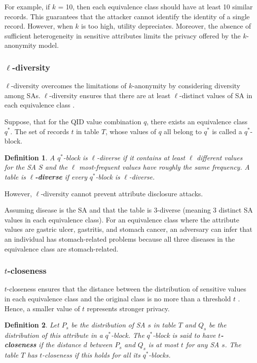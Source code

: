 \documentclass{bioinfo}
\newtheorem{definition}{Definition}
\newcommand{\mpara}[1]{\medskip\noindent{\bf #1}}
\begin{document}
For example, if $k$ = 10, then each equivalence class should have at least 10 similar records. This guarantees that the attacker cannot identify the identity of a single record. However, when $k$ is too high, utility depreciates. Moreover, the absence of sufficient heterogeneity in sensitive attributes limits the privacy offered by the $k$-anonymity model.


\subsubsection{$\ell$-diversity} 
$\ell$-diversity overcomes the limitations of $k$-anonymity by considering diversity among SAs. $\ell$-diversity ensures that there are at least $\ell$-distinct values of SA in each equivalence class \cite{cite3machanavajjhala2007diversity}.

Suppose, that for the QID value combination $q$, there exists an equivalence class $q^*$. The set of records $t$ in table $T$, whose values of $q$ all belong to $q^*$ is called a $q^*$-block.

\begin{definition}
\label{def:ldiversity}
A $q^*$-block is $\ell$-diverse if it contains at least $\ell$ different values for the SA $S$ and the $\ell$ most-frequent values have roughly the same frequency. A table is \textbf{$\ell$-diverse} if every $q^*$-block is $\ell$-diverse.
\end{definition}

However, $\ell$-diversity cannot prevent attribute disclosure attacks.

\mpara{\textit{Example.}} Assuming disease is the SA and that the table is 3-diverse (meaning 3 distinct SA values in each equivalence class). For an equivalence class where the attribute values are gastric ulcer, gastritis, and stomach cancer, an adversary can infer that an individual has stomach-related problems because all three diseases in the equivalence class are stomach-related.

\subsubsection{$t$-closeness} 
$t$-closeness ensures that the distance between the distribution of sensitive values in each equivalence class and the original class is no more than a threshold $t$ \cite{cite3li2007t}. Hence, a smaller value of $t$ represents stronger privacy.


\begin{definition}
\label{def:tcloseness}
Let $P_s$ be the distribution of SA $s$ in table $T$ and $Q_s$ be the distribution of this attribute in a $q^*$-block. The $q^*$-block is said to have \textbf{$t$-closeness} if the distance $d$ between $P_s$ and $Q_s$ is at most $t$ for any SA $s$. The table $T$ has $t$-closeness if this holds for all its $q^*$-blocks.
\end{definition}
\end{document}
